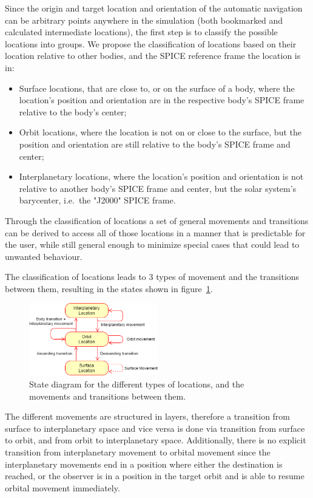 Since the origin and target location and orientation of the automatic navigation can be arbitrary points anywhere in
the simulation (both bookmarked and calculated intermediate locations), the first step is to classify the possible
locations into groups.
We propose the classification of locations based on their location relative to other bodies, and the SPICE reference
frame the location is in:
\begin{itemize}
    \item Surface locations, that are close to, or on the surface of a body, where the location's position and
    orientation are in the respective body's SPICE frame relative to the body's center;
    \item Orbit locations, where the location is not on or close to the surface, but the position and orientation
    are still relative to the body's SPICE frame and center;
    \item Interplanetary locations, where the location's position and orientation is not relative to another body's
    SPICE frame and center, but the solar system's barycenter, i.e.\ the "J2000" SPICE frame.
\end{itemize}
Through the classification of locations a set of general movements and transitions can be derived to access all of
those locations in a manner that is predictable for the user, while still general enough to minimize special cases
that could lead to unwanted behaviour.

The classification of locations leads to 3 types of movement and the transitions between them, resulting in the states
shown in figure~\ref{fig:nav-states}.

\begin{figure}[h]
    \centering
    \includegraphics[width=0.5\textwidth]{content/4_3_autoNavigation/img/NavigationLocationStates}
    \caption{State diagram for the different types of locations, and the movements and transitions between them.}
    \label{fig:nav-states}
\end{figure}

The different movements are structured in layers, therefore a transition from surface to interplanetary space and
vice versa is done via transition from surface to orbit, and from orbit to interplanetary space.
Additionally, there is no explicit transition from interplanetary movement to orbital movement since the interplanetary
movements end in a position where either the destination is reached, or the observer is in a position in the target
orbit and is able to resume orbital movement immediately.


